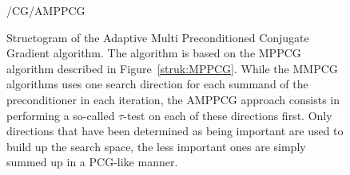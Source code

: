 \begin{figure}[h!]
	\centering
        {\tikzpath/CG/AMPPCG}
        \caption[Structogram Adaptive Multi Preconditioned Conjugate Gradient algorithm]{Structogram of the Adaptive Multi Preconditioned Conjugate Gradient algorithm. The algorithm is based on the MPPCG algorithm described in Figure~\ref{struk:MPPCG}. While the MMPCG algorithms uses one search direction for each summand of the preconditioner in each iteration, the AMPPCG approach consists in performing a so-called $\tau$-test on each of these directions first. Only directions that have been determined as being important are used to build up the search space, the less important ones are simply summed up in a PCG-like manner.}
		\label{struk:AMPPCG}
    \centering
\end{figure}